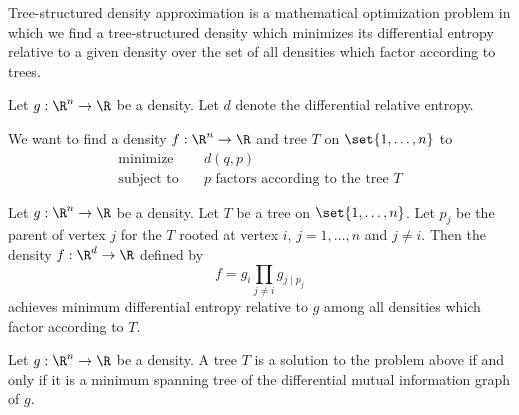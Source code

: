 


Tree-structured density
approximation is a mathematical
optimization problem in which we
find a tree-structured density
which minimizes its differential entropy relative
to a given density over the set
of all densities which factor
according to trees.


Let $g: \R^n \to \R$ be a density.
Let $d$ denote the differential
relative entropy.

We want to find a density $f: \R^n \to \R$
and tree $T$ on
$\set{1, \dots, n}$ to
\[
  \begin{aligned}
    \text{minimize}   &\quad d(q, p) \\
    \text{subject to} &\quad p \text{ factors according to the tree } T
  \end{aligned}
\]


\begin{prop}
  Let $g: \R^n \to \R$ be a density.
  Let $T$ be
  a tree on $\set{1, \dots, n}$.
  Let $p_j$ be
  the parent of vertex $j$ for the $T$ rooted
  at vertex $i$, $j = 1,\dots,n$ and $j \neq i$.
  Then the density $f: \R^d \to \R$ defined by
  \[
    f = g_i \prod_{j \neq i} g_{j \mid p_j}
  \]
  achieves minimum differential entropy relative to $g$ among
  all densities which factor according to $T$.
\end{prop}

\begin{prop}
  Let $g: \R^n \to \R$ be a density.
  A tree $T$ is a solution to the problem above
  if and only if it is a minimum spanning
  tree of the differential mutual information graph of $g$.
\end{prop}
